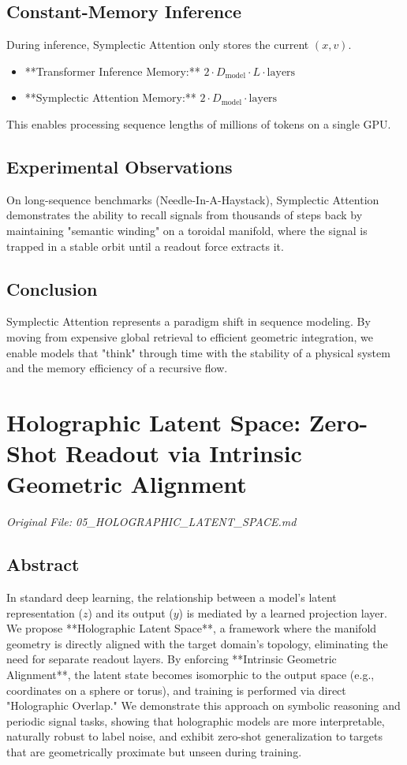 \documentclass[11pt,a4paper]{report}
\begin{document}
\section{Constant-Memory Inference}
During inference, Symplectic Attention only stores the current $(x, v)$.
\begin{itemize}
    \item **Transformer Inference Memory:** $2 \cdot D_{\text{model}} \cdot L \cdot \text{layers}$
    \item **Symplectic Attention Memory:** $2 \cdot D_{\text{model}} \cdot \text{layers}$
\end{itemize}
This enables processing sequence lengths of millions of tokens on a single GPU.

\section{Experimental Observations}
On long-sequence benchmarks (Needle-In-A-Haystack), Symplectic Attention demonstrates the ability to recall signals from thousands of steps back by maintaining "semantic winding" on a toroidal manifold, where the signal is trapped in a stable orbit until a readout force extracts it.

\section{Conclusion}
Symplectic Attention represents a paradigm shift in sequence modeling. By moving from expensive global retrieval to efficient geometric integration, we enable models that "think" through time with the stability of a physical system and the memory efficiency of a recursive flow.

\chapter{Holographic Latent Space: Zero-Shot Readout via Intrinsic Geometric Alignment}
\textit{Original File: 05\_HOLOGRAPHIC\_LATENT\_SPACE.md}

\section{Abstract}
In standard deep learning, the relationship between a model's latent representation ($z$) and its output ($y$) is mediated by a learned projection layer. We propose **Holographic Latent Space**, a framework where the manifold geometry is directly aligned with the target domain's topology, eliminating the need for separate readout layers. By enforcing **Intrinsic Geometric Alignment**, the latent state becomes isomorphic to the output space (e.g., coordinates on a sphere or torus), and training is performed via direct "Holographic Overlap." We demonstrate this approach on symbolic reasoning and periodic signal tasks, showing that holographic models are more interpretable, naturally robust to label noise, and exhibit zero-shot generalization to targets that are geometrically proximate but unseen during training.
\end{document}
